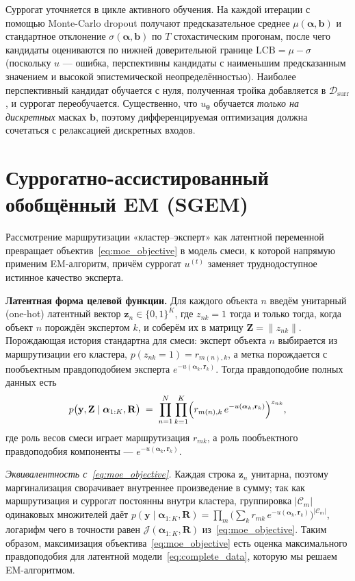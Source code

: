 Суррогат уточняется в цикле активного обучения. На каждой итерации с
помощью Monte-Carlo dropout получают предсказательное среднее
$\mu(\boldsymbol{\alpha}, \boldsymbol{b})$ и стандартное отклонение
$\sigma(\boldsymbol{\alpha}, \boldsymbol{b})$ по $T$ стохастическим
прогонам, после чего кандидаты оцениваются по нижней доверительной
границе $\mathrm{LCB} = \mu - \sigma$ (поскольку $u$ --- ошибка,
перспективны кандидаты с наименьшим предсказанным значением и высокой
эпистемической неопределённостью). Наиболее перспективный кандидат
обучается с нуля, полученная тройка добавляется в
$\mathcal{D}_{\text{surr}}$, и суррогат переобучается. Существенно, что
$u_{\boldsymbol{\theta}}$ обучается \emph{только на дискретных} масках
$\boldsymbol{b}$, поэтому дифференцируемая оптимизация должна сочетаться
с релаксацией дискретных входов.

\section{Суррогатно-ассистированный обобщённый EM (SGEM)}
\label{sec:sgem}

Рассмотрение маршрутизации «кластер--эксперт» как латентной переменной
превращает объектив~\eqref{eq:moe_objective} в модель смеси, к которой
напрямую применим EM-алгоритм, причём суррогат $u^{(t)}$ заменяет
труднодоступное истинное качество эксперта.

\textbf{Латентная форма целевой функции.} Для каждого объекта $n$ введём
унитарный (one-hot) латентный вектор $\mathbf{z}_n \in \{0,1\}^K$, где
$z_{nk} = 1$ тогда и только тогда, когда объект $n$ порождён экспертом
$k$, и соберём их в матрицу $\mathbf{Z} = \|z_{nk}\|$. Порождающая
история стандартна для смеси: эксперт объекта $n$ выбирается из
маршрутизации его кластера, $p(z_{nk} = 1) = r_{m(n), k}$, а метка
порождается с пообъектным правдоподобием эксперта
$e^{-u(\boldsymbol{\alpha}_k, \mathbf{r}_k)}$. Тогда правдоподобие
полных данных есть
\begin{equation}
\label{eq:complete_data}
p\bigl(\mathbf{y}, \mathbf{Z} \mid \boldsymbol{\alpha}_{1:K}, \mathbf{R}\bigr)
\;=\; \prod_{n=1}^{N} \prod_{k=1}^{K}
\Bigl( r_{m(n), k}\, e^{-u(\boldsymbol{\alpha}_k, \mathbf{r}_k)} \Bigr)^{z_{nk}},
\end{equation}
где роль весов смеси играет маршрутизация $r_{mk}$, а роль пообъектного
правдоподобия компоненты --- $e^{-u(\boldsymbol{\alpha}_k, \mathbf{r}_k)}$.

\emph{Эквивалентность с~\eqref{eq:moe_objective}.} Каждая строка
$\mathbf{z}_n$ унитарна, поэтому маргинализация сворачивает внутреннее
произведение в сумму; так как маршрутизация и суррогат постоянны внутри
кластера, группировка $|\mathcal{C}_m|$ одинаковых множителей даёт
$p(\mathbf{y} \mid \boldsymbol{\alpha}_{1:K}, \mathbf{R})
= \prod_{m} \bigl(\sum_{k} r_{mk}\, e^{-u(\boldsymbol{\alpha}_k, \mathbf{r}_k)}\bigr)^{|\mathcal{C}_m|}$,
логарифм чего в точности равен
$\mathcal{J}(\boldsymbol{\alpha}_{1:K}, \mathbf{R})$
из~\eqref{eq:moe_objective}. Таким образом, максимизация
объектива~\eqref{eq:moe_objective} есть оценка максимального
правдоподобия для латентной модели~\eqref{eq:complete_data}, которую мы
решаем EM-алгоритмом.

